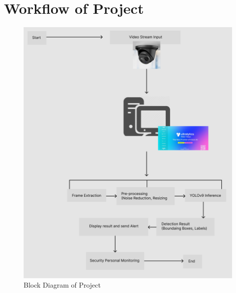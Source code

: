\section{Workflow of Project}
    \begin{figure}[H]
        \centering
        \includegraphics[width=0.8\linewidth]{img/Diagram.png}
        \caption{Block Diagram of Project}
        \label{fig:diagram}
    \end{figure}